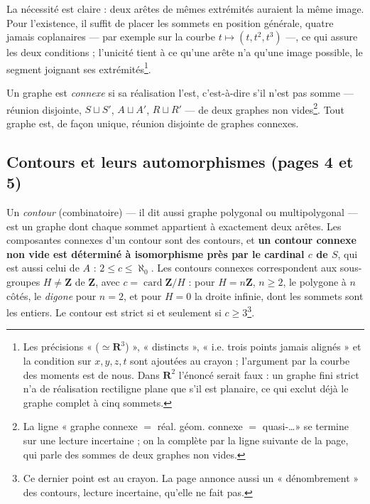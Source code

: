 \documentclass[11pt,a4paper]{article}
\begin{document}
La nécessité est claire : deux arêtes de mêmes extrémités auraient la même
image. Pour l'existence, il suffit de placer les sommets en position générale,
quatre jamais coplanaires --- par exemple sur la courbe $t \mapsto (t, t^2,
t^3)$ ---, ce qui assure les deux conditions ; l'unicité tient à ce qu'une
arête n'a qu'une image possible, le segment joignant ses extrémités\footnote{Les
précisions « ($\simeq \mathbf{R}^3$) », « distincts », « i.e. trois points
jamais alignés » et la condition sur $x, y, z, t$ sont ajoutées au crayon ;
l'argument par la courbe des moments est de nous. Dans $\mathbf{R}^2$
l'énoncé serait faux : un graphe fini strict n'a de réalisation rectiligne
plane que s'il est planaire, ce qui exclut déjà le graphe complet à cinq
sommets.}.

Un graphe est \emph{connexe} si sa réalisation l'est, c'est-à-dire s'il n'est
pas somme --- réunion disjointe, $S \sqcup S'$, $A \sqcup A'$,
$R \sqcup R'$ --- de deux graphes non vides\footnote{La ligne « graphe connexe
$=$ réal. géom. connexe $=$ quasi-\ldots » se termine sur une lecture
incertaine ; on la complète par la ligne suivante de la page, qui parle des
sommes de deux graphes non vides.}. Tout graphe est, de façon unique, réunion
disjointe de graphes connexes.

\subsection*{Contours et leurs automorphismes (pages 4 et 5)}

Un \emph{contour} (combinatoire) --- il dit aussi graphe polygonal ou
multipolygonal --- est un graphe dont chaque sommet appartient à exactement
deux arêtes. Les composantes connexes d'un contour sont des contours, et
\textbf{un contour connexe non vide est déterminé à isomorphisme près par le
cardinal $c$ de $S$}, qui est aussi celui de $A$ : $2 \leq c \leq \aleph_0$.
Les contours connexes correspondent aux sous-groupes $H \neq \mathbf{Z}$ de
$\mathbf{Z}$, avec $c = \operatorname{card} \mathbf{Z}/H$ : pour $H =
n\mathbf{Z}$, $n \geq 2$, le polygone à $n$ côtés, le \emph{digone} pour
$n = 2$, et pour $H = 0$ la droite infinie, dont les sommets sont les entiers.
Le contour est strict si et seulement si $c \geq 3$\footnote{Ce dernier point
est au crayon. La page annonce aussi un « dénombrement » des contours,
lecture incertaine, qu'elle ne fait pas.}.
\end{document}
